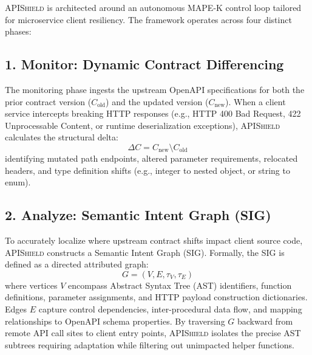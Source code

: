 \textsc{APIShield} is architected around an autonomous MAPE-K control loop tailored for microservice client resiliency. The framework operates across four distinct phases:

\subsection{1. Monitor: Dynamic Contract Differencing}
The monitoring phase ingests the upstream OpenAPI specifications for both the prior contract version ($C_{\text{old}}$) and the updated version ($C_{\text{new}}$). When a client service intercepts breaking HTTP responses (e.g., HTTP 400 Bad Request, 422 Unprocessable Content, or runtime deserialization exceptions), \textsc{APIShield} calculates the structural delta:
\[
\Delta C = C_{\text{new}} \setminus C_{\text{old}}
\]
identifying mutated path endpoints, altered parameter requirements, relocated headers, and type definition shifts (e.g., integer to nested object, or string to enum).

\subsection{2. Analyze: Semantic Intent Graph (SIG)}
To accurately localize where upstream contract shifts impact client source code, \textsc{APIShield} constructs a Semantic Intent Graph (SIG). Formally, the SIG is defined as a directed attributed graph:
\[
G = (V, E, \tau_V, \tau_E)
\]
where vertices $V$ encompass Abstract Syntax Tree (AST) identifiers, function definitions, parameter assignments, and HTTP payload construction dictionaries. Edges $E$ capture control dependencies, inter-procedural data flow, and mapping relationships to OpenAPI schema properties. By traversing $G$ backward from remote API call sites to client entry points, \textsc{APIShield} isolates the precise AST subtrees requiring adaptation while filtering out unimpacted helper functions.

